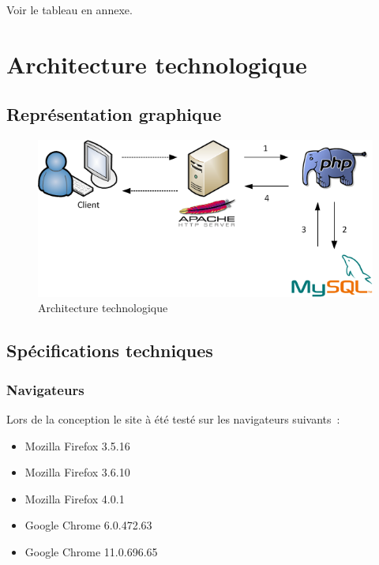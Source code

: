 \documentclass[letter, 11pt, draft]{report}
\begin{document}
Voir le tableau en annexe.

\chapter{Architecture technologique}

\section{Représentation graphique}

\begin{figure}[htbp]
	\begin{center}
		\includegraphics[scale=0.75]{architectureTechnologique.png}
	\end{center}
	\caption{Architecture technologique}
\end{figure}

\section{Spécifications techniques}


\subsection{Navigateurs}
Lors de la conception le site à été testé sur les navigateurs suivants~:

\begin{itemize}
	\item Mozilla Firefox 3.5.16
	\item Mozilla Firefox 3.6.10
	\item Mozilla Firefox 4.0.1
	\item Google Chrome 6.0.472.63
	\item Google Chrome 11.0.696.65
\end{itemize}
\end{document}
